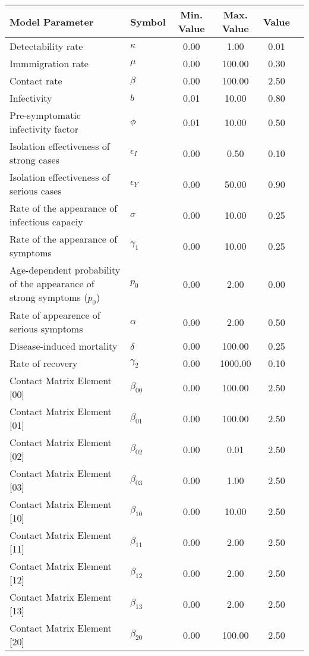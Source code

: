 \begin{table}
\centering
\begin{tabular}{p{5cm}lcccc}
{\bf Model Parameter} & {\bf Symbol} & {\bf Min. Value} & {\bf Max. Value} & {\bf Value}\\
\hline\hline
Detectability rate & $\kappa$ & 0.00 & 1.00 & 0.01\\
Immmigration rate & $\mu$ & 0.00 & 100.00 & 0.30\\
Contact rate & $\beta$ & 0.00 & 100.00 & 2.50\\
Infectivity & $b$ & 0.01 & 10.00 & 0.80\\
Pre-symptomatic infectivity factor & $\phi$ & 0.01 & 10.00 & 0.50\\
Isolation effectiveness of strong cases & $\epsilon_I$ & 0.00 & 0.50 & 0.10\\
Isolation effectiveness of serious cases & $\epsilon_Y$ & 0.00 & 50.00 & 0.90\\
Rate of the appearance of infectious capaciy & $\sigma$ & 0.00 & 10.00 & 0.25\\
Rate of the appearance of symptoms & $\gamma_1$ & 0.00 & 10.00 & 0.25\\
Age-dependent probability of the appearance of strong symptoms ($p_0$) & $p_0$ & 0.00 & 2.00 & 0.00\\
Rate of appearence of serious symptoms & $\alpha$ & 0.00 & 2.00 & 0.50\\
Disease-induced mortality & $\delta$ & 0.00 & 100.00 & 0.25\\
Rate of recovery & $\gamma_2$ & 0.00 & 1000.00 & 0.10\\
Contact Matrix Element [00] & $\beta_{00}$ & 0.00 & 100.00 & 2.50\\
Contact Matrix Element [01] & $\beta_{01}$ & 0.00 & 100.00 & 2.50\\
Contact Matrix Element [02] & $\beta_{02}$ & 0.00 & 0.01 & 2.50\\
Contact Matrix Element [03] & $\beta_{03}$ & 0.00 & 1.00 & 2.50\\
Contact Matrix Element [10] & $\beta_{10}$ & 0.00 & 10.00 & 2.50\\
Contact Matrix Element [11] & $\beta_{11}$ & 0.00 & 2.00 & 2.50\\
Contact Matrix Element [12] & $\beta_{12}$ & 0.00 & 2.00 & 2.50\\
Contact Matrix Element [13] & $\beta_{13}$ & 0.00 & 2.00 & 2.50\\
Contact Matrix Element [20] & $\beta_{20}$ & 0.00 & 100.00 & 2.50\\

\end{tabular}
\end{table}
